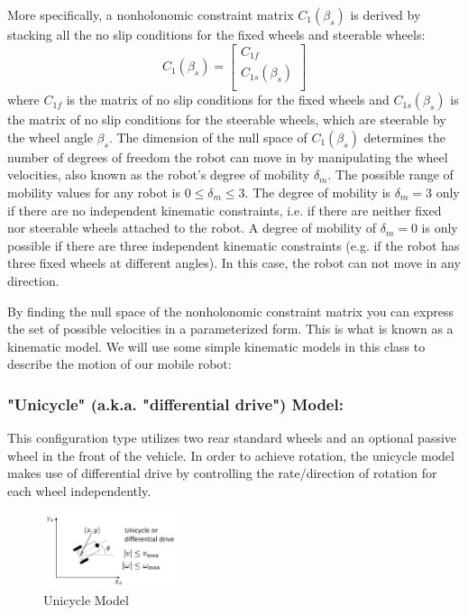 \documentclass[twoside]{article}
\begin{document}
More specifically, a nonholonomic constraint matrix $C_1(\beta_s)$ is derived by stacking all the no slip conditions for the fixed wheels and steerable wheels:
$$C_1(\beta_s)= \begin{bmatrix}
           C_{1f} \\
           C_{1s}(\beta_s) \\
         \end{bmatrix}$$
where $C_{1f}$ is the matrix of no slip conditions for the fixed wheels and $C_{1s}(\beta_s)$ is the matrix of no slip conditions for the steerable wheels, which are steerable by the wheel angle $\beta_s$. The dimension of the null space of $C_1(\beta_s)$ determines the number of degrees of freedom the robot can move in by manipulating the wheel velocities, also known as the robot's degree of mobility $\delta_m$. The possible range of mobility values for any robot is $0 \leq \delta_m \leq 3.$ The degree of mobility is $\delta_m=3$ only if there are no independent kinematic constraints, i.e. if there are neither fixed nor steerable wheels attached to the robot. A degree of mobility of $\delta_m=0$ is only possible if there are three independent kinematic constraints (e.g. if the robot has three fixed wheels at different angles). In this case, the robot can not move in any direction.

By finding the null space of the nonholonomic constraint matrix you can express the set of possible velocities in a parameterized form. This is what is known as a kinematic model. We will use some simple kinematic models in this class to describe the motion of our mobile robot:

\subsubsection*{"Unicycle" (a.k.a. "differential drive") Model:}

This configuration type utilizes two rear standard wheels and an optional passive wheel in the front of the vehicle. In order to achieve rotation, the unicycle model makes use of differential drive by controlling the rate/direction of rotation for each wheel independently\cite{sns}.

\begin{figure}[H]
\centering
\includegraphics[width=0.35\textwidth]{unicycle}
\caption{Unicycle Model}
\end{figure}
\end{document}
